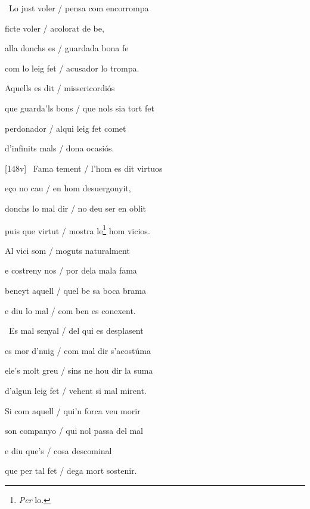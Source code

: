 \documentclass[12pt]{article}
\begin{document}
\begin{estrofa}

 \textparagraph\  Lo just voler / pensa com encorrompa

 ficte voler / acolorat de be,

 alla donchs es / guardada bona fe

 com lo leig fet / acusador lo trompa.

 Aquells es dit / missericordi\'{o}s

 que guarda'ls bons / que nols sia tort fet

 perdonador / alqui leig fet comet

 d'infinits mals / dona ocasi\'{o}s.

\end{estrofa}



\begin{estrofa}

 [148v] \textparagraph\  Fama tement / l'hom es dit virtuos

 e\c{c}o no cau / en hom desuergonyit,

 donchs lo mal dir / no deu ser en oblit

 puis que virtut / mostra le\footnote{\textit{Per} lo.} hom vicios.

 Al vici som / moguts naturalment

 e costreny nos / por dela mala fama

 beneyt aquell / quel be sa boca brama

 e diu lo mal / com ben es conexent.

\end{estrofa}



\begin{estrofa}

 \textparagraph\  Es mal senyal / del qui es desplasent

 es mor d'nuig / com mal dir s'acost\'{u}ma

 ele's molt greu / sins ne hou dir la suma

 d'algun leig fet / vehent si mal mirent.

 Si com aquell / qui'n forca veu morir

 son companyo / qui nol passa del mal

 e diu que's / cosa descominal

 que per tal fet / dega mort sostenir.

\end{estrofa}
\end{document}
